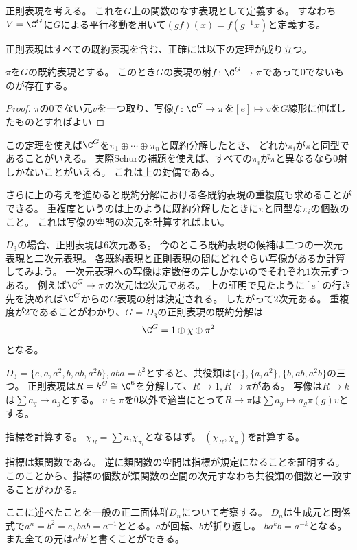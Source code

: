 \documentclass{jsarticle}
\begin{document}
正則表現を考える。
これを$G$上の関数のなす表現として定義する。
すなわち$V=\C^G$に$G$による平行移動を用いて$(gf)(x)=f(g^{-1}x)$と定義する。

正則表現はすべての既約表現を含む、正確には以下の定理が成り立つ。
\begin{prop}
$\pi$を$G$の既約表現とする。
このとき$G$の表現の射$f\colon\C^G\to \pi$であって$0$でないものが存在する。
\end{prop}
\begin{proof}
$\pi$の$0$でない元$v$を一つ取り、写像$f\colon \C^G\to \pi$を$[e]\mapsto v$を$G$線形に伸ばしたものとすればよい
\end{proof}

この定理を使えば$\C^G$を$\pi_1\oplus\cdots\oplus\pi_n$と既約分解したとき、
どれか$\pi_i$が$\pi$と同型であることがいえる。
実際Schurの補題を使えば、すべての$\pi_i$が$\pi$と異なるなら$0$射しかないことがいえる。
これは上の対偶である。

さらに上の考えを進めると既約分解における各既約表現の重複度も求めることができる。
重複度というのは上のように既約分解したときに$\pi$と同型な$\pi_i$の個数のこと。
これは写像の空間の次元を計算すればよい。

$D_3$の場合、正則表現は$6$次元ある。
今のところ既約表現の候補は二つの一次元表現と二次元表現。
各既約表現と正則表現の間にどれぐらい写像があるか計算してみよう。
一次元表現への写像は定数倍の差しかないのでそれぞれ$1$次元ずつある。
例えば$\C^G\to \pi$の次元は$2$次元である。
上の証明で見たように$[e]$の行き先を決めれば$\C^G$からの$G$表現の射は決定される。
したがって$2$次元ある。
重複度が$2$であることがわかり、$G=D_3$の正則表現の既約分解は
\begin{align*}
\C^G=1\oplus\chi\oplus\pi^2
\end{align*}
となる。

$D_3=\{e,a,a^2,b,ab,a^2b\}, aba=b^2$とすると、共役類は$\{e\}, \{a,a^2\},\{b,ab,a^2b\}$の三つ。
正則表現は$R=k^G\cong \C^6$を分解して、$R \to 1, R\to \pi$がある。
写像は$R \to k$は$\sum a_g\mapsto a_g$とする。
$v\in\pi$を$0$以外で適当にとって$R \to \pi$は$\sum a_g\mapsto a_g\pi(g)v$とする。

指標を計算する。
$\chi_R=\sum n_i\chi_{\pi_i}$となるはず。
$(\chi_R,\chi_\pi)$を計算する。

指標は類関数である。
逆に類関数の空間は指標が規定になることを証明する。
このことから、指標の個数が類関数の空間の次元すなわち共役類の個数と一致することがわかる。


ここに述べたことを一般の正二面体群$D_n$について考察する。
$D_n$は生成元と関係式で$a^n=b^2=e, bab=a^{-1}$ととる。$a$が回転、$b$が折り返し。
$ba^kb=a^{-k}$となる。また全ての元は$a^kb^l$と書くことができる。
\end{document}
